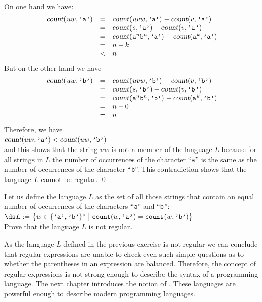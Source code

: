 \\[0.2cm]
On one hand we have:
\[  
\begin{array}{lcl}
\textsl{count}(uw,\texttt{'a'}) & = & \textsl{count}(uvw,\texttt{'a'}) - \textsl{count}(v,\texttt{'a'}) \\
 & = & \textsl{count}(s,\texttt{'a'}) - \textsl{count}(v,\texttt{'a'}) \\
 & = & \textsl{count}(\mathtt{a}^n\mathtt{b}^n,\texttt{'a'}) - \textsl{count}(\mathtt{a}^k,\texttt{'a'}) \\
 & = & n - k  \\
 & < & n   \\
\end{array}
\]
But on the other hand we have
\[  
\begin{array}{lcl}
\textsl{count}(uw,\texttt{'b'}) & = & \textsl{count}(uvw,\texttt{'b'}) - \textsl{count}(v,\texttt{'b'}) \\
                               & = & \textsl{count}(s,\texttt{'b'}) - \textsl{count}(v,\texttt{'b'}) \\
 & = & \textsl{count}(\mathtt{a}^n\mathtt{b}^n,\texttt{'b'}) - \textsl{count}(\mathtt{a}^k,\texttt{'b'}) \\
                               & = & n  - 0\\
                               & = & n  
\end{array}
\]
Therefore, we have
\\[0.2cm]
\hspace*{1.3cm}
$\textsl{count}(uw,\texttt{'a'}) < \textsl{count}(uw,\texttt{'b'})$
\\[0.2cm]
and this shows that the string $uw$ is not a member of the language $L$ because for all strings in $L$ 
the number of occurrences of the character ``\texttt{a}'' is the same as the number of
occurrences of the character ``\texttt{b}''.  This contradiction shows that the language $L$ cannot
be regular.
\qed

\exerciseEng
Let us define the language $L$ as the set of all those strings that contain an equal number of 
occurrences of the characters ``\texttt{a}'' and  ``\texttt{b}'':
\\[0.2cm]
\hspace*{1.3cm}
$\ds L := \bigl\{ w \in \{\texttt{'a'}, \texttt{'b'}\}^* \bigm| \texttt{count}(w, \texttt{'a'})=\texttt{count}(w, \texttt{'b'}) \bigr\}$
\\[0.2cm]
Prove that the language $L$ is not regular. \eox

\remarkEng
As the language $L$ defined in the previous exercise is not regular we can conclude that regular expressions
are unable to check even such simple questions as to whether the parentheses in an expression are balanced.
Therefore, the concept of regular expressions is not strong enough to describe the syntax of a programming language.
The next chapter introduces the notion of .  These languages
are powerful enough to describe modern programming languages. 

